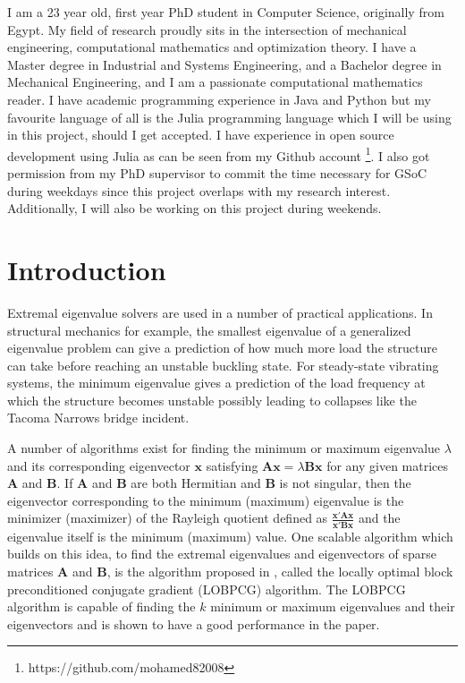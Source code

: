 \documentclass[12pt]{article}
\begin{document}
I am a 23 year old, first year PhD student in Computer Science, originally from Egypt. My field of research proudly sits in the intersection of mechanical engineering, computational mathematics and optimization theory. I have a Master degree in Industrial and Systems Engineering, and a Bachelor degree in Mechanical Engineering, and I am a passionate computational mathematics reader. I have academic programming experience in Java and Python but my favourite language of all is the Julia programming language which I will be using in this project, should I get accepted. I have experience in open source development using Julia as can be seen from my Github account \footnote{https://github.com/mohamed82008}. I also got permission from my PhD supervisor to commit the time necessary for GSoC during weekdays since this project overlaps with my research interest. Additionally, I will also be working on this project during weekends.

\section{Introduction}

Extremal eigenvalue solvers are used in a number of practical applications. In structural mechanics for example, the smallest eigenvalue of a generalized eigenvalue problem can give a prediction of how much more load the structure can take before reaching an unstable buckling state. For steady-state vibrating systems, the minimum eigenvalue gives a prediction of the load frequency at which the structure becomes unstable possibly leading to collapses like the Tacoma Narrows bridge incident. 

A number of algorithms exist for finding the minimum or maximum eigenvalue $\lambda$ and its corresponding eigenvector $\bm{x}$ satisfying $\bm{A}\bm{x} = \lambda \bm{B}\bm{x}$ for any given matrices $\bm{A}$ and $\bm{B}$. If $\bm{A}$ and $\bm{B}$ are both Hermitian and $\bm{B}$ is not singular, then the eigenvector corresponding to the minimum (maximum) eigenvalue is the minimizer (maximizer) of the Rayleigh quotient defined as $\frac{\bm{x}'\bm{A}\bm{x}}{\bm{x}'\bm{B}\bm{x}}$ and the eigenvalue itself is the minimum (maximum) value. One scalable algorithm which builds on this idea, to find the extremal eigenvalues and eigenvectors of sparse matrices $\bm{A}$ and $\bm{B}$, is the algorithm proposed in \cite{Knyazev2001}, called the locally optimal block preconditioned conjugate gradient (LOBPCG) algorithm. The LOBPCG algorithm is capable of finding the $k$ minimum or maximum eigenvalues and their eigenvectors and is shown to have a good performance in the paper.
\end{document}
